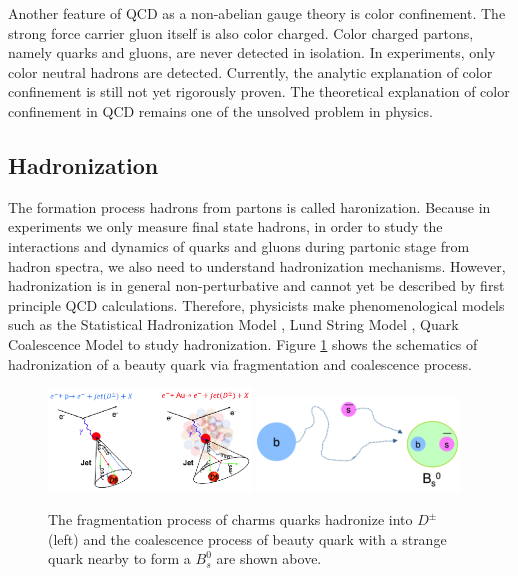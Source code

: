 Another feature of QCD as a non-abelian gauge theory is color confinement. The strong force carrier gluon itself is also color charged. Color charged partons, namely quarks and gluons, are never detected in isolation. In experiments, only color neutral hadrons are detected. Currently, the analytic explanation of color confinement is still not yet rigorously proven. The theoretical explanation of color confinement in QCD remains one of the unsolved problem in physics. 

\subsection{Hadronization}

The formation process hadrons from partons is called haronization. Because in experiments we only measure final state hadrons, in order to study the interactions and dynamics of quarks and gluons during partonic stage from hadron spectra, we also need to understand hadronization mechanisms. However, hadronization is in general non-perturbative and cannot yet be described by first principle QCD calculations. Therefore, physicists make phenomenological models such as the Statistical Hadronization Model \cite{SHM}, Lund String Model \cite{LSM}, Quark Coalescence Model \cite{QCM} to study hadronization. Figure  \ref{HadMech} shows the schematics of hadronization of a beauty quark via fragmentation and coalescence process.

\begin{figure}[hbtp]
\begin{center}
\includegraphics[width=0.48\textwidth]{Figures/Chapter1/FragCartoon.png}
\includegraphics[width=0.48\textwidth]{Figures/Chapter1/CoalCartoon.png}
\caption{The fragmentation process of charms quarks hadronize into $D^\pm$ (left) and the coalescence process of beauty quark with a strange quark nearby to form a $B^0_s$ are shown above.}
\label{HadMech}
\end{center}
\end{figure} 

